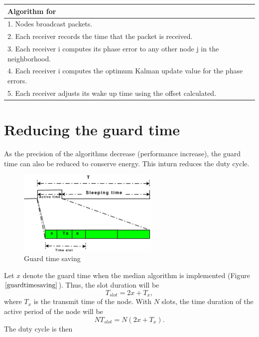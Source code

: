 \documentclass[a4paper,10pt]{report}
\begin{document}
\newline  \newline
\begin{tabular}{  l }Algorithm for \nomenclature{KF}{Kalman Filter} \\ \hline
1. Nodes broadcast packets. \\  2. Each receiver records the time that the packet is received. \\
3. Each receiver i computes its phase error to any other node j in the neighborhood. \\
4. Each receiver i computes the optimum Kalman update value for the phase errors. \\
5. Each receiver adjusts its wake up time using the offset calculated.\\
\hline
\end{tabular}
\section{\textbf{Reducing the guard time}}
As the precision of the algorithms decrease (performance increase), the guard time can also be reduced to conserve energy. This inturn
reduces the duty cycle.
\begin{figure}
\centering
\includegraphics[width=0.6\textwidth]{guardtimesaving}
\caption{Guard time saving} \label{guardtimesaving}
\end{figure}
\newline 
Let $x$ denote the guard time when the median algorithm is implemented (Figure $\ref{guardtimesaving}$). Thus, the slot
duration will be 
\begin{equation}
T_{slot}=2x + T_x ,
\end{equation}
where $T_x$ is the transmit time of the node. 
\newline With $N$ slots, the time duration of the active period of the node will be
\begin{equation}
NT_{slot}=N(2x + T_x). \label{slot}
\end{equation}
The duty cycle is then
\end{document}
